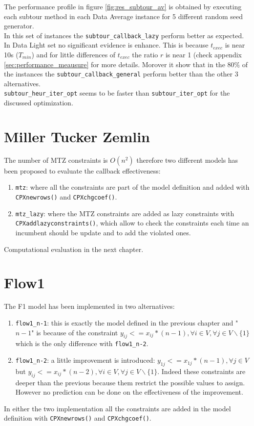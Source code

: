 The performance profile in figure \ref{fig:res_subtour_av} is obtained by executing each subtour method in each Data Average instance for 5 different random seed generator. \\
In this set of instances the \texttt{subtour\_callback\_lazy} perform better as expected. In Data Light set no significant evidence is enhance. This is because $ t_{exec} $ is near 10s ($ T_{min} $) and for little differences of $ t_{exec} $ the ratio $ r $ is near 1 (check appendix \ref{sec:performance_meausure} for more details.
Morover it show that in the $ 80\%  $  of the instances the \texttt{subtour\_callback\_general} perform better than the other 3 alternatives.\\
\texttt{subtour\_heur\_iter\_opt} seems to be faster than \texttt{subtour\_iter\_opt} for the discussed optimization. 


\section{Miller Tucker Zemlin}
The number of MTZ constraints is $O(n^2)$ therefore two different models has been proposed to evaluate the callback effectiveness:
\begin{enumerate}
	\item \texttt{mtz}: where all the constraints are part of the model definition and added with \texttt{CPXnewrows()} and \texttt{CPXchgcoef()}. 
	\item \texttt{mtz\_lazy}: where the MTZ constraints are added as lazy constraints with \texttt{CPXaddlazyconstraints()}, which allow to check the constraints each time an incumbent should be update and to add the violated ones.
\end{enumerate}

Computational evaluation in the next chapter.

\section{Flow1}
The F1 model has been implemented in two alternatives:
\begin{enumerate}
	\item \texttt{flow1\_n-1}: this is exactly the model defined in the previous chapter and "$ n-1 $" is because of  the constraint  $ y_{ij} <= x_{ij}*(n-1), \forall i \in V, \forall j \in V \backslash \{1\} $ which is the only difference with \texttt{flow1\_n-2}. 
	\item \texttt{flow1\_n-2}: a little improvement is introduced: $ y_{1j} <= x_{1j}*(n-1), \forall j \in V $ but $ y_{ij} <= x_{ij}*(n-2), \forall i \in V, \forall j \in V \backslash \{1\} $. Indeed these constraints are deeper than the previous because them restrict the possible values to assign. However no prediction can be done on the effectiveness of the improvement.
\end{enumerate}
In either the two implementation all the constraints are added in the model definition with \texttt{CPXnewrows()} and \texttt{CPXchgcoef()}.

